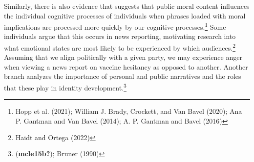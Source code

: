 \documentclass[12pt]{book}
\theoremstyle{definition}
\theoremstyle{remark}
\begin{document}
Similarly, there is also evidence that suggests that public moral content influences the individual cognitive processes of individuals when phrases loaded with moral implications are processed more quickly by our cognitive processes.\footnote{Hopp et al. (2021); William J. Brady, Crockett, and Van Bavel (2020); Ana P. Gantman and Van Bavel (2014); A. P. Gantman and Bavel (2016)} Some individuals argue that this occurs in news reporting, motivating research into what emotional states are most likely to be experienced by which audiences.\footnote{Haidt and Ortega (2022)} Assuming that we align politically with a given party, we may experience anger when viewing a news report on vaccine hesitancy as opposed to another. Another branch analyzes the importance of personal and public narratives and the roles that these play in identity development.\footnote{(\textbf{mcle15b?}); Bruner (1990)}
\end{document}

